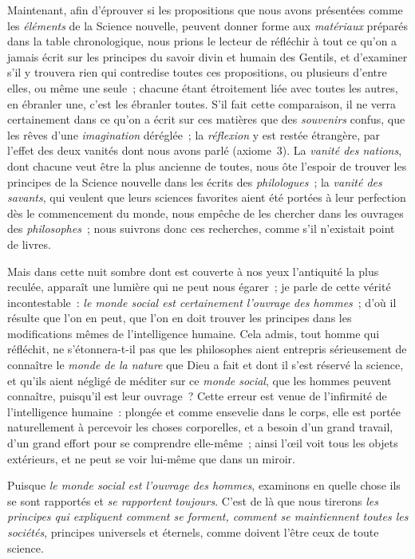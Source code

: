 \documentclass[french,twoside]{book} %
\newcommand\chaptercont{} %
\begin{document}
\chaptercont
\noindent  Maintenant, afin d’éprouver si les propositions que nous avons présentées comme les {\itshape éléments} de la Science nouvelle, peuvent donner forme aux {\itshape matériaux} préparés dans la table chronologique, nous prions le lecteur de réfléchir à tout ce qu’on a jamais écrit sur les principes du savoir divin et humain des Gentils, et d’examiner s’il y trouvera rien qui contredise toutes ces propositions, ou plusieurs d’entre elles, ou même une seule ; chacune étant étroitement liée avec toutes les autres, en ébranler une, c’est les ébranler toutes. S’il fait cette comparaison, il ne verra certainement dans ce qu’on a écrit sur ces matières que des {\itshape souvenirs} confus, que les rêves d’une {\itshape imagination} déréglée ; la {\itshape réflexion} y est restée étrangère, par l’effet des deux vanités dont nous avons parlé (axiome 3). La {\itshape vanité des nations}, dont chacune veut être la plus ancienne de toutes, nous ôte l’espoir de trouver les principes  de la Science nouvelle dans les écrits des {\itshape philologues} ; la {\itshape vanité des savants}, qui veulent que leurs sciences favorites aient été portées à leur perfection dès le commencement du monde, nous empêche de les chercher dans les ouvrages des {\itshape philosophes} ; nous suivrons donc ces recherches, comme s’il n’existait point de livres.\par
Mais dans cette nuit sombre dont est couverte à nos yeux l’antiquité la plus reculée, apparaît une lumière qui ne peut nous égarer ; je parle de cette vérité incontestable : {\itshape le monde social est certainement l’ouvrage des hommes} ; d’où il résulte que l’on en peut, que l’on en doit trouver les principes dans les modifications mêmes de l’intelligence humaine. Cela admis, tout homme qui réfléchit, ne s’étonnera-t-il pas que les philosophes aient entrepris sérieusement de connaître le {\itshape monde de la nature} que Dieu a fait et dont il s’est réservé la science, et qu’ils aient négligé de méditer sur ce {\itshape monde social}, que les hommes peuvent connaître, puisqu’il est leur ouvrage ? Cette erreur est venue de l’infirmité de l’intelligence humaine : plongée et comme ensevelie dans le corps, elle est portée naturellement à percevoir les choses corporelles, et a besoin d’un grand travail, d’un grand effort pour se comprendre elle-même ; ainsi l’œil voit tous les objets extérieurs, et ne peut se voir lui-même que dans un miroir.\par
Puisque {\itshape le monde social est l’ouvrage des hommes}, examinons en quelle chose ils se sont rapportés et  {\itshape se rapportent toujours}. C’est de là que nous tirerons {\itshape les principes qui expliquent comment se forment, comment se maintiennent toutes les sociétés}, principes universels et éternels, comme doivent l’être ceux de toute science.\par
\end{document}
